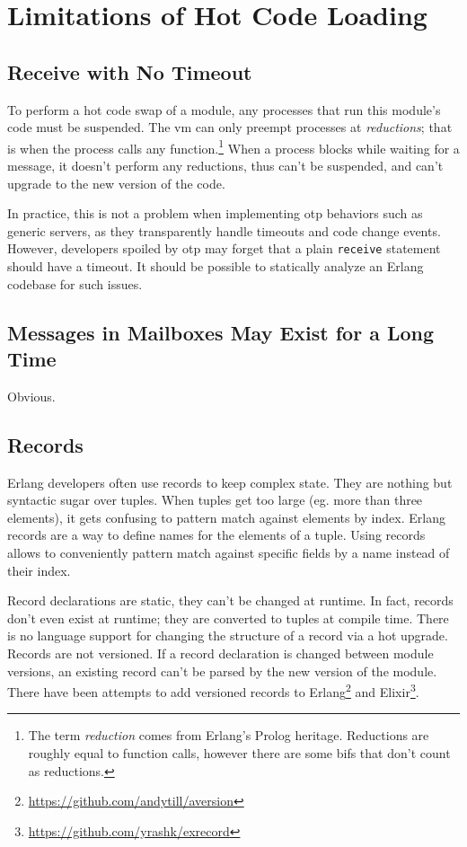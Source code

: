 \section{Limitations of Hot Code Loading}

\subsection{Receive with No Timeout}

To perform a hot code swap of a module, any processes that run this module's code must be suspended. The \acrshort{vm} can only preempt processes at \emph{reductions}; that is when the process calls any function.\footnote{The term \emph{reduction} comes from Erlang's Prolog heritage. Reductions are roughly equal to function calls, however there are some \acrshort{bif}s that don't count as reductions.} When a process blocks while waiting for a message, it doesn't perform any reductions,  thus can't be suspended, and can't upgrade to the new version of the code.

In practice, this is not a problem when implementing \acrshort{otp} behaviors such as generic servers, as they transparently handle timeouts and code change events. However, developers spoiled by \acrshort{otp} may forget that a plain \lstinline|receive| statement should have a timeout. It should be possible to statically analyze an Erlang codebase for such issues.


\subsection{Messages in Mailboxes May Exist for a Long Time}

Obvious.


\subsection{Records}

Erlang developers often use records to keep complex state. They are nothing but syntactic sugar over tuples. When tuples get too large (eg. more than three elements), it gets confusing to pattern match against elements by index. Erlang records are a way to define names for the elements of a tuple. Using records allows to conveniently pattern match against specific fields by a name instead of their index.

Record declarations are static, they can't be changed at runtime. In fact, records don't even exist at runtime; they are converted to tuples at compile time. There is no language support for changing the structure of a record via a hot upgrade. Records are not versioned. If a record declaration is changed between module versions, an existing record can't be parsed by the new version of the module. There have been attempts to add versioned records to Erlang\footnote{\url{https://github.com/andytill/aversion}} and Elixir\footnote{\url{https://github.com/yrashk/exrecord}}.

